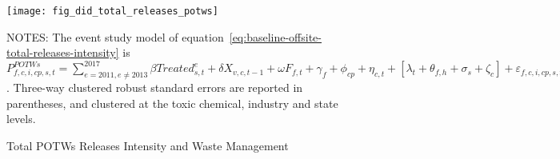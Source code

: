 \begin{figure}[H]
    \centering
    \texttt{[image: fig\_did\_total\_releases\_potws]}
    \caption{Total POTWs Releases Intensity and Waste Management}
    \label{fig:baseline-potws-total-releases-intensity}
    \begin{minipage}{12cm}
        \vspace{0.05in}
        NOTES: The event study model of equation~\ref{eq:baseline-offsite-total-releases-intensity} is $P_{f,c,i,cp,s,t}^{POTWs} = \sum_{{e = 2011},{e \neq 2013}}^{2017} \beta Treated_{s,t}^e + \delta X_{v,c,t-1} + \omega F_{f,t} + \gamma_{f} + \phi_{cp} + \eta_{c,t} + \left[\lambda_{t} + \theta_{f,h} + \sigma_{s} + \zeta_{c} \right] + \varepsilon_{f,c,i,cp,s,t}$. Three-way clustered robust standard errors are reported in parentheses, and clustered at the toxic chemical, industry and state levels.
    \end{minipage}
\end{figure}